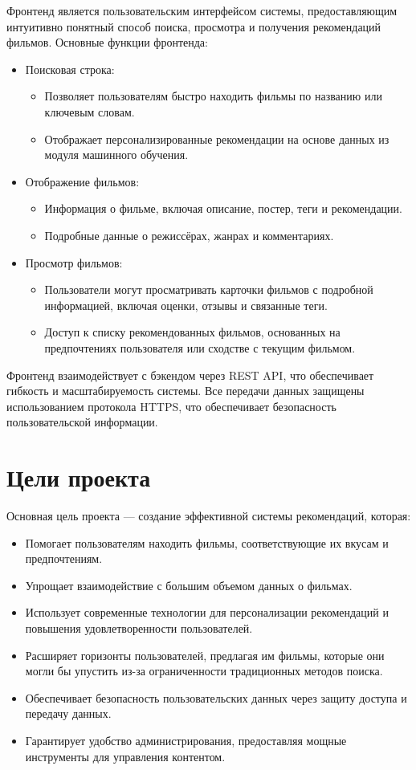 Фронтенд является пользовательским интерфейсом системы, предоставляющим интуитивно понятный способ поиска, просмотра и получения рекомендаций фильмов. Основные функции фронтенда:
\begin{itemize}
    \item Поисковая строка:
    \begin{itemize}
        \item Позволяет пользователям быстро находить фильмы по названию или ключевым словам.
        \item Отображает персонализированные рекомендации на основе данных из модуля машинного обучения.
    \end{itemize}
    \item Отображение фильмов:
    \begin{itemize}
        \item Информация о фильме, включая описание, постер, теги и рекомендации.
        \item Подробные данные о режиссёрах, жанрах и комментариях.
    \end{itemize}
    \item Просмотр фильмов:
    \begin{itemize}
        \item Пользователи могут просматривать карточки фильмов с подробной информацией, включая оценки, отзывы и связанные теги.
        \item Доступ к списку рекомендованных фильмов, основанных на предпочтениях пользователя или сходстве с текущим фильмом.
    \end{itemize}
\end{itemize}

Фронтенд взаимодействует с бэкендом через REST API, что обеспечивает гибкость и масштабируемость системы. Все передачи данных защищены использованием протокола HTTPS, что обеспечивает безопасность пользовательской информации.

\section*{Цели проекта}

Основная цель проекта — создание эффективной системы рекомендаций, которая:
\begin{itemize}
    \item Помогает пользователям находить фильмы, соответствующие их вкусам и предпочтениям.
    \item Упрощает взаимодействие с большим объемом данных о фильмах.
    \item Использует современные технологии для персонализации рекомендаций и повышения удовлетворенности пользователей.
    \item Расширяет горизонты пользователей, предлагая им фильмы, которые они могли бы упустить из-за ограниченности традиционных методов поиска.
    \item Обеспечивает безопасность пользовательских данных через защиту доступа и передачу данных.
    \item Гарантирует удобство администрирования, предоставляя мощные инструменты для управления контентом.
\end{itemize}

